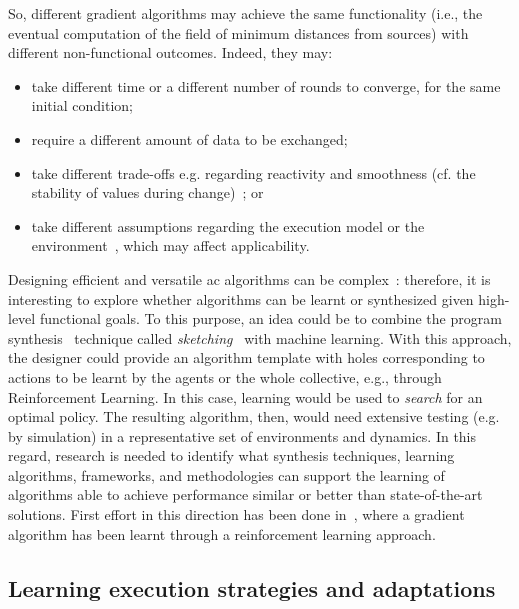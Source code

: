 So, different gradient algorithms may achieve the same functionality (i.e., the eventual computation of the field of minimum distances from sources)
 with different non-functional outcomes.
%
Indeed, they may:
\begin{itemize}
  \item take different time or a different number of rounds to converge, for the same initial condition;
  \item require a different amount of data to be exchanged;
  \item take different trade-offs e.g. regarding reactivity and smoothness (cf. the stability of values during change)~\cite{DBLP:journals/cee/AudritoCDPV21,DBLP:conf/saso/AudritoCDV17};
 or 
 \item take different assumptions regarding the execution model or the environment~\cite{DBLP:journals/cee/AudritoCDPV21}, which may affect applicability.
\end{itemize}
Designing efficient and versatile \ac{ac} algorithms can be complex~\cite{DBLP:journals/cee/AudritoCDPV21,DBLP:conf/saso/AudritoCDV17}: therefore, 
 it is interesting to explore
 whether algorithms can be learnt or synthesized
 given high-level functional goals.
%
To this purpose,
 an idea could be to combine
 the program synthesis~\cite{DBLP:journals/ftpl/GulwaniPS17} technique called \emph{sketching}~\cite{solar2008program-synthesis-sketching}
 with machine learning.
%
With this approach,
 the designer could provide an algorithm template
 with holes corresponding to actions
 to be learnt by the agents or the whole collective,
 e.g., through Reinforcement Learning.
%
In this case, learning would be used to \emph{search}
 for an optimal policy.
%
The resulting algorithm, then, would need extensive testing (e.g. by simulation) in a representative set of environments and dynamics.
%
In this regard, research is needed to identify what synthesis techniques, learning algorithms, frameworks, and methodologies can support the learning of algorithms able to achieve performance similar or better than state-of-the-art solutions.
%
First effort in this direction has been done in~\cite{DBLP:conf/coordination/CasadeiPVN19}, where a gradient algorithm has been learnt through a reinforcement learning approach. %

\subsection{Learning execution strategies and adaptations}

